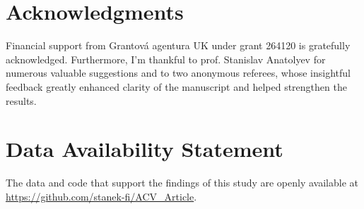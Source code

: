 \documentclass[11pt,dvipsnames]{article}
\begin{document}
\section*{Acknowledgments}
Financial support from Grantová agentura UK under grant 264120 is gratefully acknowledged.
Furthermore, I'm thankful to prof. Stanislav Anatolyev for numerous valuable suggestions and to two anonymous referees, whose insightful feedback greatly enhanced clarity of the manuscript and helped strengthen the results.

\section*{Data Availability Statement}
The data and code that support the findings of this study are openly available at \url{https://github.com/stanek-fi/ACV_Article}.

\newpage

% 
 
\newpage
\end{document}
